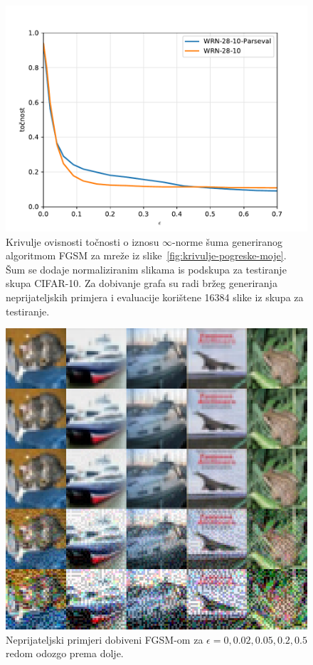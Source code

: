 \documentclass[utf8, seminar, numeric, lmodern]{feri}
\begin{document}
\begin{figure}[htbp]
	\centering
	\includegraphics[width=1\linewidth]{ilustracije/grafovi/otpornost}
	\caption{
		Krivulje ovisnosti točnosti o iznosu $\infty$-norme šuma generiranog algoritmom FGSM za mreže iz slike~\ref{fig:krivulje-pogreske-moje}. Šum se dodaje normaliziranim slikama is podskupa za testiranje skupa CIFAR-10. Za dobivanje grafa su radi bržeg generiranja neprijateljskih primjera i evaluacije korištene 16384 slike iz skupa za testiranje.
	}
	\label{fig:krivulje-otpornosti}
\end{figure}

\begin{figure}[htbp]
	\centering
	\includegraphics[width=0.6\linewidth]{ilustracije/slike/np-eps025251}
	\caption{
		Neprijateljski primjeri dobiveni FGSM-om za $\epsilon=0,0.02,0.05,0.2,0.5$ redom odozgo prema dolje.
	}
	\label{fig:neprijateljski-primjeri}
\end{figure}
\end{document}
